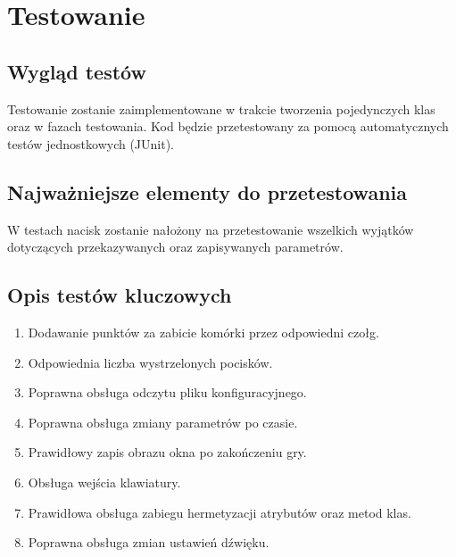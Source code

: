 \documentclass[a4paper]{article}
\begin{document}
\section{Testowanie}
\subsection{Wygl\k{a}d test\'ow}

\quad Testowanie zostanie zaimplementowane w trakcie tworzenia pojedynczych klas oraz w fazach testowania. Kod b\k{e}dzie przetestowany za pomoc\k{a} automatycznych test\'ow jednostkowych (JUnit).

\subsection{Najwa\.zniejsze elementy do przetestowania}

\quad W testach nacisk zostanie na\l{}o\.zony na przetestowanie wszelkich wyj\k{a}tk\'ow dotycz\k{a}cych przekazywanych oraz zapisywanych parametr\'ow.


\subsection{Opis test\'ow kluczowych}

\begin{enumerate}
    \item Dodawanie punkt\'ow za zabicie kom\'orki przez odpowiedni czo\l{}g.
    \item Odpowiednia liczba wystrzelonych pocisk\'ow.
    \item Poprawna obs\l{}uga odczytu pliku konfiguracyjnego.
    \item Poprawna obs\l{}uga zmiany parametr\'ow po czasie.
    \item Prawid\l{}owy zapis obrazu okna po zako\'nczeniu gry.
    \item Obs\l{}uga wej\'scia klawiatury.
    \item Prawid\l{}owa obs\l{}uga zabiegu hermetyzacji atrybut\'ow oraz metod klas.
    \item Poprawna obs\l{}uga zmian ustawie\'n d\'zwi\k{e}ku.
\end{enumerate}
    
\end{document}
